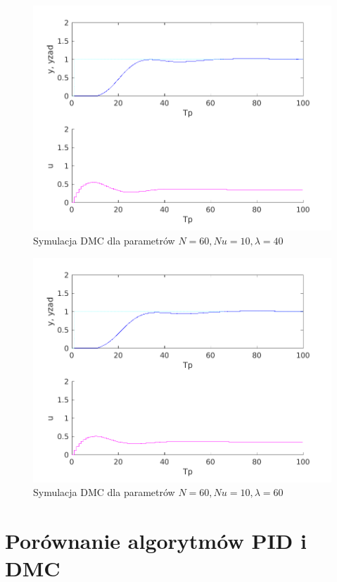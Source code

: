 \documentclass[a4paper, 10pt]{article}
\begin{document}
\begin{figure}
	\centering
	\includegraphics[width=0.7\linewidth]{z5_60_60_10_40.png}
	\caption{Symulacja DMC dla parametrów $N=60, Nu = 10, \lambda = 40$}
	\label{fig:z5_60_60_10_40}
\end{figure}
\begin{figure}
	\centering
	\includegraphics[width=0.7\linewidth]{z5_60_60_10_60.png}
	\caption{Symulacja DMC dla parametrów $N=60, Nu = 10, \lambda = 60$}
	\label{fig:z5_60_60_10_60}
\end{figure}
\section{Porównanie algorytmów PID i DMC}
	
\end{document}
